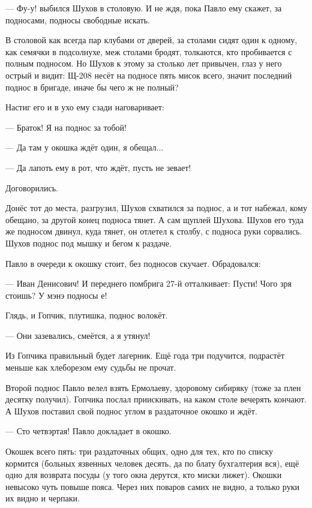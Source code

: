 --- Фу-у! \dash выбился Шухов в столовую. И не ждя, пока Павло ему скажет, \dash за подносами, подносы
свободные искать.

В столовой как всегда \dash пар клубами от дверей, за столами сидят один к одному, как семячки в
подсолнухе, меж столами бродят, толкаются, кто пробивается с полным подносом. Но Шухов к
этому за столько лет привычен, глаз у него острый и видит: Щ-208 несёт на подносе пять мисок
всего, значит \dash последний поднос в бригаде, иначе бы \dash чего ж не полный?

Настиг его и в ухо ему сзади наговаривает:

--- Браток! Я на поднос \dash за тобой!

--- Да там у окошка ждёт один, я обещал...

--- Да лапоть ему в рот, что ждёт, пусть не зевает!

Договорились.

Донёс тот до места, разгрузил, Шухов схватился за поднос, а и тот набежал, кому обещано, за
другой конец подноса тянет. А сам щуплей Шухова. Шухов его туда же подносом двинул, куда
тянет, он отлетел к столбу, с подноса руки сорвались. Шухов \dash поднос под мышку и бегом к
раздаче.

Павло в очереди к окошку стоит, без подносов скучает. Обрадовался:

--- Иван Денисович! \dash И переднего помбрига 27-й отталкивает: \Dash Пусти! Чого зря стоишь? У мэнэ
подносы е!

Глядь, и Гопчик, плутишка, поднос волокёт.

--- Они зазевались, \dash смеётся, \Dash а я утянул!

Из Гопчика правильный будет лагерник. Ещё года три подучится, подрастёт \dash меньше как
хлеборезом ему судьбы не прочат.

Второй поднос Павло велел взять Ермолаеву, здоровому сибиряку (тоже за плен десятку
получил). Гопчика послал приискивать, на каком столе вечерять кончают. А Шухов поставил свой
поднос углом в раздаточное окошко и ждёт.

--- Сто четвэртая! \dash Павло докладает в окошко.

Окошек всего пять: три раздаточных общих, одно для тех, кто по списку кормится (больных
язвенных человек десять, да по блату бухгалтерия вся), ещё одно \dash для возврата посуды (у того
окна дерутся, кто миски лижет). Окошки невысоко \dash чуть повыше пояса. Через них поваров самих
не видно, а только руки их видно и черпаки.

